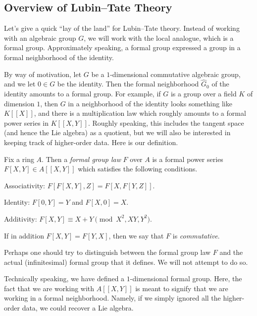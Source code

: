 \documentclass[../notes.tex]{subfiles}
\begin{document}
\subsection{Overview of Lubin--Tate Theory}
Let's give a quick ``lay of the land'' for Lubin--Tate theory. Instead of working with an algebraic group $G$, we will work with the local analogue, which is a formal group. Approximately speaking, a formal group expressed a group in a formal neighborhood of the identity.

By way of motivation, let $G$ be a $1$-dimensional commutative algebraic group, and we let $0\in G$ be the identity. Then the formal neighborhood $\widehat G_0$ of the identity amounts to a formal group. For example, if $G$ is a group over a field $K$ of dimension $1$, then $G$ in a neighborhood of the identity looks something like $K[[X]]$, and there is a multiplication law which roughly amounts to a formal power series in $K[[X,Y]]$. Roughly speaking, this includes the tangent space (and hence the Lie algebra) as a quotient, but we will also be interested in keeping track of higher-order data. Here is our definition.
\begin{definition}
	Fix a ring $A$. Then a \textit{formal group law} $F$ over $A$ is a formal power series $F[X,Y]\in A[[X,Y]]$ which satisfies the following conditions.
	\begin{listalph}
		\item Associativity: $F[F[X,Y],Z]=F[X,F[Y,Z]]$.
		\item Identity: $F[0,Y]=Y$ and $F[X,0]=X$.
		\item Additivity: $F[X,Y]\equiv X+Y\pmod{X^2,XY,Y^2}$.
	\end{listalph}
	If in addition $F[X,Y]=F[Y,X]$, then we say that $F$ is \textit{commutative}.
\end{definition}
\begin{remark}
	Perhaps one should try to distinguish between the formal group law $F$ and the actual (infinitesimal) formal group that it defines. We will not attempt to do so.
\end{remark}
Technically speaking, we have defined a $1$-dimensional formal group. Here, the fact that we are working with $A[[X,Y]]$ is meant to signify that we are working in a formal neighborhood. Namely, if we simply ignored all the higher-order data, we could recover a Lie algebra.
\end{document}
